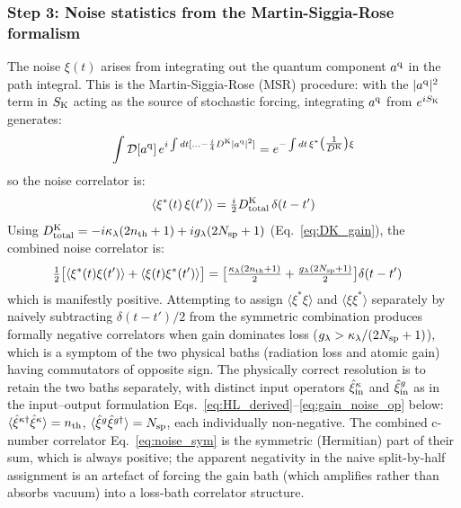 \documentclass[12pt]{article}
\newcommand{\q}{{\rm q}}
\newcommand{\Keldysh}{{\rm K}}
\begin{document}
\subsubsection*{Step 3: Noise statistics from the Martin-Siggia-Rose
formalism}

The noise $\xi(t)$ arises from integrating out the quantum component
$a^\q$ in the path integral.  This is the Martin-Siggia-Rose (MSR)
procedure: with the $|a^\q|^2$ term in $S_\Keldysh$ acting as the
source of stochastic forcing, integrating $a^\q$ from
$e^{iS_\Keldysh}$ generates:
\begin{equation}
  \int\mathcal{D}[a^\q]\,
  e^{i\int dt[\ldots -\frac{i}{4}D^\Keldysh|a^\q|^2]}
  = e^{-\int dt\,\xi^*\bigl(\tfrac{1}{D^\Keldysh}\bigr)\xi}
  \label{eq:MSR}
\end{equation}
so the noise correlator is:
\begin{equation}
  \langle\xi^*(t)\,\xi(t')\rangle =
  \tfrac{i}{2}D^\Keldysh_{\rm total}\,\delta(t-t')
  \label{eq:noise_correlator_raw}
\end{equation}
Using $D^\Keldysh_{\rm total} = -i\kappa_\lambda(2n_{\rm th}+1)
+ ig_\lambda(2N_{\rm sp}+1)$ (Eq.~\ref{eq:DK_gain}), the combined
noise correlator is:
\begin{align}
  \tfrac{1}{2}\bigl[\langle\xi^*(t)\xi(t')\rangle
  +\langle\xi(t)\xi^*(t')\rangle\bigr]
  &= \bigl[\tfrac{\kappa_\lambda(2n_{\rm th}+1)}{2}
  + \tfrac{g_\lambda(2N_{\rm sp}+1)}{2}\bigr]\delta(t-t')
  \label{eq:noise_sym}
\end{align}
which is manifestly positive.  Attempting to assign
$\langle\xi^*\xi\rangle$ and $\langle\xi\xi^*\rangle$ separately by
naively subtracting $\delta(t-t')/2$ from the symmetric combination
produces formally negative correlators when gain dominates loss
($g_\lambda>\kappa_\lambda/(2N_{\rm sp}+1)$), which is a symptom of
the two physical baths (radiation loss and atomic gain) having
commutators of opposite sign.  The physically correct resolution is to
retain the two baths separately, with distinct input operators
$\hat\xi^\kappa_{\rm in}$ and $\hat\xi^g_{\rm in}$ as in the
input--output formulation Eqs.~\eqref{eq:HL_derived}--\eqref{eq:gain_noise_op}
below:
$\langle\hat\xi^{\kappa\dagger}\hat\xi^\kappa\rangle=n_{\rm th}$,
$\langle\hat\xi^g\hat\xi^{g\dagger}\rangle=N_{\rm sp}$, each
individually non-negative.  The combined c-number correlator
Eq.~\eqref{eq:noise_sym} is the symmetric (Hermitian) part of their
sum, which is always positive; the apparent negativity in the naive
split-by-half assignment is an artefact of forcing the gain bath
(which amplifies rather than absorbs vacuum) into a loss-bath
correlator structure.
\end{document}
